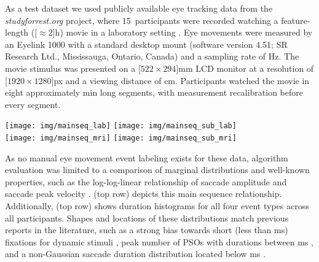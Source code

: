 As a test dataset we used publicly available eye tracking data from the
\textit{studyforrest.org} project, where 15~participants were recorded watching
a feature-length (\unit[$\approx$2]{h}) movie in a laboratory setting
\citep{Hanke2016}. Eye movements were measured by an Eyelink 1000 with a
standard desktop mount (software version 4.51; SR Research Ltd., Mississauga,
Ontario, Canada) and a sampling rate of \unit[1000]{Hz}. The movie stimulus was
presented on a \unit[$522\times294$]{mm} LCD monitor at a resolution of
\unit[$1920\times1280$]{px} and a viewing distance of \unit[85]{cm}. Participants
watched the movie in eight approximately \unit[15]{min} long segments,
with measurement recalibration before every segment.

\begin{figure*}[tbp]
  \texttt{[image: img/mainseq\_lab]}
  \texttt{[image: img/mainseq\_sub\_lab]} \\
  \texttt{[image: img/mainseq\_mri]}
  \texttt{[image: img/mainseq\_sub\_mri]}

  \caption{Main sequence of eye movement events during one 15 minute sequence of
  the movie (segment 2) for lab (top), and MRI participants (bottom). Data
  across all participants per dataset is shown on the left, and data for a single
  exemplary participant on the right.}

  \label{fig:overallComp}
\end{figure*}

As no manual eye movement event labeling exists for these data, algorithm
evaluation was limited to a comparison of marginal distributions and well-known
properties, such as the log-log-linear relationship of saccade amplitude and
saccade peak velocity \citep{bahill1975main}.  (top row)
depicts this main sequence relationship.
%
Additionally,  (top row) shows duration histograms for all four event
types across all participants. Shapes and locations of these distributions
match previous reports in the literature, such as a strong bias towards short
(less than \unit[500]{ms}) fixations for dynamic stimuli
\citep[Fig.~3]{dorr2010variability}, peak number of PSOs with durations between
\unit[10-20]{ms} \citep[Fig.~11]{Nystrom2010AnData}, and a non-Gaussian saccade
duration distribution located below \unit[100]{ms} \citep[Fig.~8, albeit for
static scene perception]{Nystrom2010AnData}.

